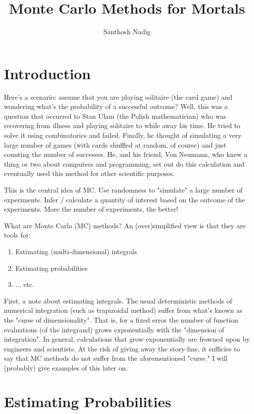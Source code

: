 \documentclass[11pt,onecolumn]{article}
\begin{document}
\title{Monte Carlo Methods for Mortals}
\author{Santhosh Nadig}
\maketitle
\pagebreak
\section{Introduction}
Here's a scenario: assume that you are playing solitaire (the card game) and wondering what's the probability of a successful outcome? Well, this was a question that occurred to Stan Ulam (the Polish mathematician) who was recovering from illness and playing solitaire to while away his time. He tried to solve it using combinatorics and failed. Finally, he thought of simulating a very large number of games (with cards shuffled at random, of course) and just counting the number of successes. He, and his friend, Von Neumann, who knew a thing or two about computers and programming, set out do this calculation and eventually used this method for other scientific purposes.

This is the central idea of MC. Use randomness to "simulate" a large number of experiments. Infer / calculate a quantity of interest based on the outcome of the experiments. More the number of experiments, the better!

What are Monte Carlo (MC) methods? An (over)simplified view is that they are tools for:
\begin{enumerate}
 \item Estimating (multi-dimensional) integrals
 \item Estimating probabilities
 \item ... etc.
\end{enumerate}

First, a note about estimating integrals. The usual deterministic methods of numerical integration (such as trapizoidal method) suffer from what's known as the "curse of dimensionality". That is, for a fixed error the number of function evaluations (of the integrand) grows exponentially with the "dimension of integration". In general, calculations that grow exponentially are frowned upon by engineers and scientists. At the risk of giving away the story-line, it sufficies to say that MC methods do not suffer from the aforementioned "curse." I will (probably) give examples of this later on.

\section{Estimating Probabilities} 
\end{document}
